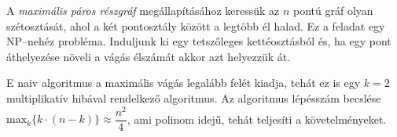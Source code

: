 A \emph{maximális páros részgráf} megállapításához keressük az $n$ pontú gráf olyan 
szétosztását, ahol a két pontosztály között a legtöbb él halad. Ez a feladat egy
NP--nehéz probléma. Induljunk ki egy tetszőleges kettéosztásból és, ha egy pont
áthelyezése növeli a vágás élszámát akkor azt helyezzük át.

E naiv algoritmus a maximális vágás legalább felét kiadja, tehát ez is egy $k=2$
multiplikatív hibával rendelkező algoritmus. Az algoritmus lépésszám becslése
$\mbox{max}_k\{k\cdot(n-k)\}\approx \dfrac{n^2}{4}$, ami polinom idejű, tehát teljesíti
a követelményeket.
